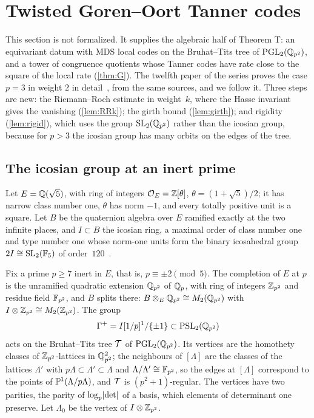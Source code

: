 \section{Twisted Goren--Oort Tanner codes}\label{sec:arith}

This section is not formalized. It supplies the algebraic half of Theorem T: an equivariant datum with MDS local codes
on the Bruhat--Tits tree of $\operatorname{PGL}_2(\mathbb{Q}_{p^2})$, and a tower of congruence quotients whose Tanner codes have rate close to
the square of the local rate (\cref{thm:G}). The twelfth paper of the series proves the case $p=3$ in weight $2$ in
detail~\cite[Section~6]{Luck2026}, from the same sources, and we follow it. Three steps are new: the Riemann--Roch
estimate in weight~$k$, where the Hasse invariant gives the vanishing (\cref{lem:RRk}); the girth bound
(\cref{lem:girth}); and rigidity (\cref{lem:rigid}), which uses the group $\operatorname{SL}_2(\mathbb{Q}_{p^2})$ rather than the icosian group,
because for $p>3$ the icosian group has many orbits on the edges of the tree.

\subsection{The icosian group at an inert prime}\label{sec:arith-group}

Let $E=\mathbb{Q}(\sqrt5)$, with ring of integers $\mathcal{O}_E=\mathbb{Z}[\theta]$, $\theta=(1+\sqrt5)/2$; it has narrow class number one,
$\theta$ has norm $-1$, and every totally positive unit is a square. Let $B$ be the quaternion algebra over $E$ ramified
exactly at the two infinite places, and $I\subset B$ the icosian ring, a maximal order of class number one and type
number one whose norm-one units form the binary icosahedral group $2I\cong\operatorname{SL}_2(\mathbb{F}_5)$ of
order~$120$~\cite[Proposition~V.3.4, Corollaire~I.4.11 and p.~155]{Vigneras1980}.

Fix a prime $p\ge7$ inert in $E$, that is, $p\equiv\pm2\pmod5$. The completion of $E$ at $p$ is the unramified quadratic
extension $\mathbb{Q}_{p^2}$ of $\mathbb{Q}_p$, with ring of integers $\mathbb{Z}_{p^2}$ and residue field $\mathbb{F}_{p^2}$, and $B$ splits there:
$B\otimes_E\mathbb{Q}_{p^2}\cong M_2(\mathbb{Q}_{p^2})$ with $I\otimes\mathbb{Z}_{p^2}\cong M_2(\mathbb{Z}_{p^2})$. The group
\[
  \Gamma^+=I[1/p]^1/\{\pm1\}\subset\operatorname{PSL}_2(\mathbb{Q}_{p^2})
\]
acts on the Bruhat--Tits tree $\mathcal{T}$ of $\operatorname{PGL}_2(\mathbb{Q}_{p^2})$. Its vertices are the homothety classes of
$\mathbb{Z}_{p^2}$-lattices in $\mathbb{Q}_{p^2}^2$; the neighbours of $[\Lambda]$ are the classes of the lattices $\Lambda'$ with
$p\Lambda\subset\Lambda'\subset\Lambda$ and $\Lambda/\Lambda'\cong\mathbb{F}_{p^2}$, so the edges at $[\Lambda]$ correspond to
the points of $\mathbb{P}^1(\Lambda/p\Lambda)$, and $\mathcal{T}$ is $(p^2+1)$-regular. The vertices have two parities, the parity of
$\log_p\lvert \det \rvert$ of a basis, which elements of determinant one preserve. Let $\Lambda_0$ be the vertex of
$I\otimes\mathbb{Z}_{p^2}$.


